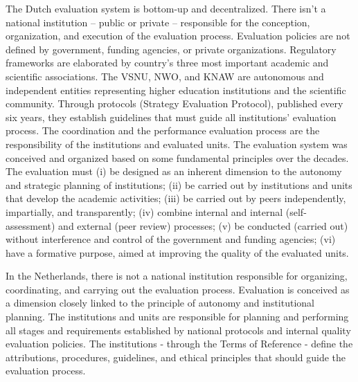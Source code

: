 The Dutch evaluation system is bottom-up and decentralized. There isn't a national institution – public or private – responsible for the conception, organization, and execution of the evaluation process. Evaluation policies are not defined by government, funding agencies, or private organizations. Regulatory frameworks are elaborated by country's three most important academic and scientific associations. The 
VSNU, NWO, and KNAW are autonomous and independent entities representing higher education institutions and the scientific community. Through protocols (Strategy Evaluation Protocol), published every six years, they establish guidelines that must guide all institutions' evaluation process. The coordination and the performance evaluation process are the responsibility of the institutions and evaluated units. The evaluation system was conceived and organized based on some fundamental principles over the decades. The evaluation must (i) be designed as an inherent dimension to the autonomy and strategic planning of institutions; (ii) be carried out by institutions and units that develop the academic activities; (iii) be carried out by peers independently, impartially, and transparently; (iv) combine internal and internal (self-assessment) and external (peer review) processes; (v) be conducted (carried out) without interference and control of the government and funding agencies; (vi) have a formative purpose, aimed at improving the quality of the evaluated units.  

In the Netherlands, there is not a national institution responsible for organizing, coordinating, and carrying out the evaluation process. Evaluation is conceived as a dimension closely linked to the principle of autonomy and institutional planning. The institutions and units are responsible for planning and performing all stages and requirements established by national protocols and internal quality evaluation policies. The institutions - through the Terms of Reference - define the attributions, procedures, guidelines, and ethical principles that should guide the evaluation process.  

